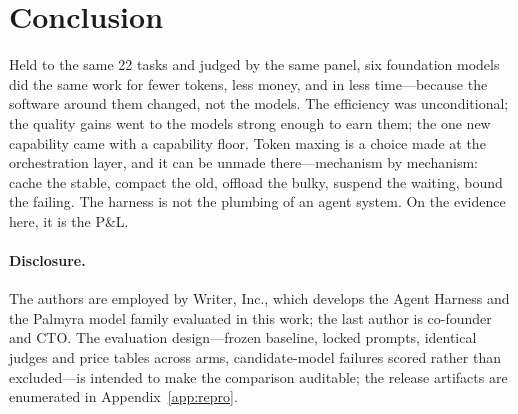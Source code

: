 \documentclass[11pt]{article}
\newcommand{\NP}{22}                    %
\begin{document}
\section{Conclusion}

Held to the same \NP{} tasks and judged by the same panel, six foundation models did the same work for \TokD{} fewer tokens, \CostD{} less money, and in \LatD{} less time---because the software around them changed, not the models. The efficiency was unconditional; the quality gains went to the models strong enough to earn them; the one new capability came with a capability floor. Token maxing is a choice made at the orchestration layer, and it can be unmade there---mechanism by mechanism: cache the stable, compact the old, offload the bulky, suspend the waiting, bound the failing. The harness is not the plumbing of an agent system. On the evidence here, it is the P\&L.

\paragraph{Disclosure.} The authors are employed by Writer, Inc., which develops the Agent Harness and the Palmyra model family evaluated in this work; the last author is co-founder and CTO. The evaluation design---frozen baseline, locked prompts, identical judges and price tables across arms, candidate-model failures scored rather than excluded---is intended to make the comparison auditable; the release artifacts are enumerated in Appendix~\ref{app:repro}.
\end{document}
